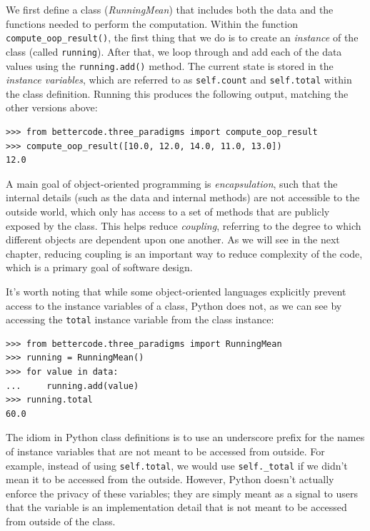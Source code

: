 

We first define a class (\textit{RunningMean}) that includes both the data and the functions needed to perform the computation.  Within the function \texttt{compute\_oop\_result()}, the first thing that we do is to create an \textit{instance} of the class (called \texttt{running}). After that, we loop through and add each of the data values using the \texttt{running.add()} method.  The current state is stored in the \textit{instance variables}, which are referred to as \texttt{self.count} and \texttt{self.total} within the class definition. Running this produces the following output, matching the other versions above:

\begin{lstlisting}[style=replshort]
>>> from bettercode.three_paradigms import compute_oop_result
>>> compute_oop_result([10.0, 12.0, 14.0, 11.0, 13.0])
12.0
\end{lstlisting}

A main goal of object-oriented programming is \textit{encapsulation}, such that the internal details (such as the data and internal methods) are not accessible to the outside world, which only has access to a set of methods that are publicly exposed by the class. This helps reduce \textit{coupling}, referring to the degree to which different objects are dependent upon one another. As we will see in the next chapter, reducing coupling is an important way to reduce complexity of the code, which is a primary goal of software design. 

It's worth noting that while some object-oriented languages explicitly prevent access to the instance variables of a class, Python does not, as we can see by accessing the \texttt{total} instance variable from the class instance:

\begin{lstlisting}[style=repl]
>>> from bettercode.three_paradigms import RunningMean
>>> running = RunningMean()
>>> for value in data:
...     running.add(value)
>>> running.total
60.0
\end{lstlisting}

The idiom in Python class definitions is to use an underscore prefix for the names of instance variables that are not meant to be accessed from outside.  For example, instead of using \texttt{self.total}, we would use \texttt{self.\_total} if we didn't mean it to be accessed from the outside.  However, Python doesn't actually enforce the privacy of these variables; they are simply meant as a signal to users that the variable is an implementation detail that is not meant to be accessed from outside of the class.

